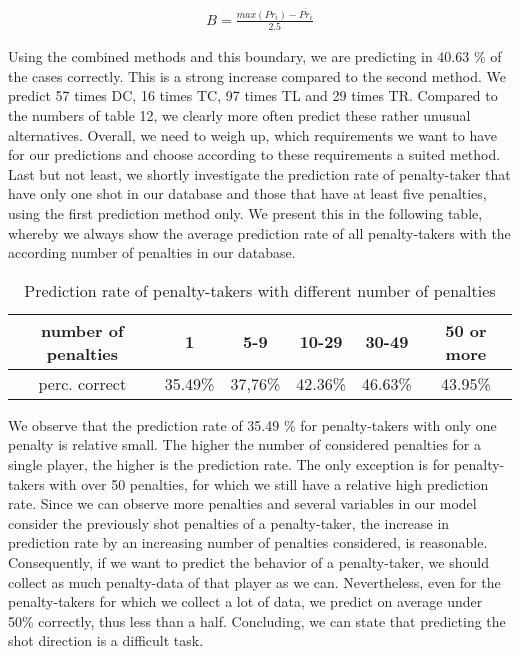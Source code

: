 \documentclass[12pt,dvipsnames]{article}%
\begin{document}
 \vspace{-2cm}
 
 \begin{center}
 \begin{align}
 B = \frac{max(Pr_i) - \overline{Pr_i}}{2.5}
 \end{align}
 \end{center}
 
 \vspace{-0.1cm}

Using the combined methods and this boundary, we are predicting in 40.63 \% of the cases correctly. This is a strong increase compared to the second method. We predict 57 times DC, 16 times TC, 97 times TL and 29 times TR. Compared to the numbers of table 12, we clearly more often predict these rather unusual alternatives. Overall, we need to weigh up, which requirements we want to have for our predictions and choose according to these requirements a suited method. \\
%
Last but not least, we shortly investigate the prediction rate of penalty-taker that have only one shot in our database and those that have at least five penalties, using the first prediction method only. We present this in the following table, whereby we always show the average prediction rate of all penalty-takers with the according number of penalties in our database.

  \begin{table}[ht]
\caption{Prediction rate of penalty-takers with different number of penalties}
\centering
\small
\begin{tabular}{  c |  c | c | c | c | c }
   number of penalties & 1 &  5-9 & 10-29  & 30-49  & 50 or more    \\
   \hline

perc. correct  & 35.49\% &  37,76\%  &  42.36\%  & 46.63\% & 43.95\%    \\  

 \end{tabular}
 \end{table}
 
We observe that the prediction rate of 35.49 \% for penalty-takers with only one penalty is relative small. The higher the number of considered penalties for a single player, the higher is the prediction rate. The only exception is for penalty-takers with over 50 penalties, for which we still have a relative high prediction rate. Since we can observe more penalties and several variables in our model consider the previously shot penalties of a penalty-taker, the increase in prediction rate by an increasing number of penalties considered, is reasonable. Consequently, if we want to predict the behavior of a penalty-taker, we should collect as much penalty-data of that player as we can. Nevertheless, even for the penalty-takers for which we collect a lot of data, we predict on average under 50\% correctly, thus less than a half. Concluding, we can state that predicting the shot direction is a difficult task.
\end{document}

